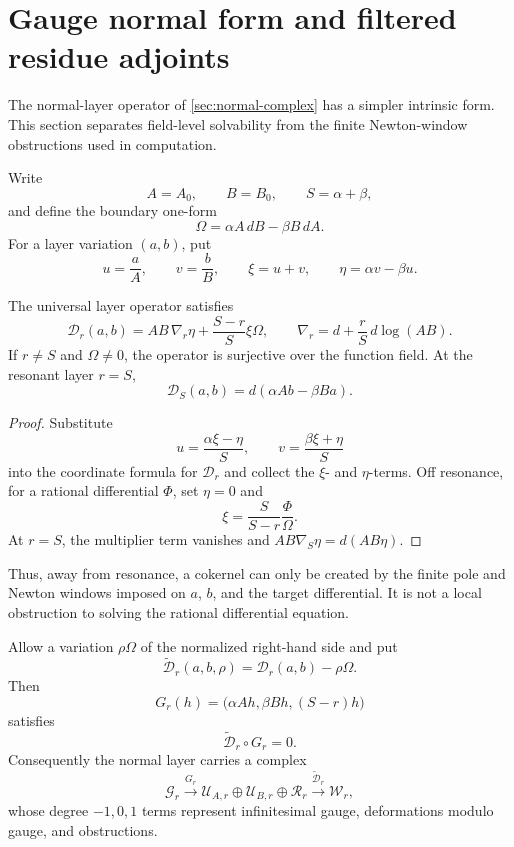 \section{Gauge normal form and filtered residue adjoints}
\label{app:gauge-filtered-residues}

The normal-layer operator of \cref{sec:normal-complex} has a simpler
intrinsic form.  This section separates field-level solvability from the
finite Newton-window obstructions used in computation.

Write
\[
A=A_0,\qquad B=B_0,\qquad S=\alpha+\beta,
\]
and define the boundary one-form
\[
\Omega=\alpha A\,dB-\beta B\,dA.
\]
For a layer variation \((a,b)\), put
\[
u=\frac aA,\qquad v=\frac bB,\qquad
\xi=u+v,\qquad \eta=\alpha v-\beta u.
\]

\begin{proposition}
\label{prop:gauge-normal-form}
The universal layer operator satisfies
\[
\mathscr D_r(a,b)
=AB\,\nabla_r\eta+\frac{S-r}{S}\xi\Omega,
\qquad
\nabla_r=d+\frac rS\,d\log(AB).
\]
If \(r\ne S\) and \(\Omega\ne0\), the operator is surjective over the
function field.  At the resonant layer \(r=S\),
\[
\mathscr D_S(a,b)
=d(\alpha Ab-\beta Ba).
\]
\end{proposition}

\begin{proof}
Substitute
\[
u=\frac{\alpha\xi-\eta}{S},\qquad
v=\frac{\beta\xi+\eta}{S}
\]
into the coordinate formula for \(\mathscr D_r\) and collect the
\(\xi\)- and \(\eta\)-terms.  Off resonance, for a rational differential
\(\Phi\), set \(\eta=0\) and
\[
\xi=\frac{S}{S-r}\frac{\Phi}{\Omega}.
\]
At \(r=S\), the multiplier term vanishes and
\(AB\nabla_S\eta=d(AB\eta)\).
\end{proof}

Thus, away from resonance, a cokernel can only be created by the finite pole
and Newton windows imposed on \(a\), \(b\), and the target differential.  It
is not a local obstruction to solving the rational differential equation.

\begin{proposition}
\label{prop:extended-complex}
Allow a variation \(\rho\Omega\) of the normalized right-hand side and put
\[
\widetilde{\mathscr D}_r(a,b,\rho)
=\mathscr D_r(a,b)-\rho\Omega.
\]
Then
\[
G_r(h)=\bigl(\alpha Ah,\beta Bh,(S-r)h\bigr)
\]
satisfies
\[
\widetilde{\mathscr D}_r\circ G_r=0.
\]
Consequently the normal layer carries a complex
\[
\mathcal G_r\xrightarrow{G_r}
\mathcal U_{A,r}\oplus\mathcal U_{B,r}\oplus\mathcal R_r
\xrightarrow{\widetilde{\mathscr D}_r}\mathcal W_r,
\]
whose degree \(-1,0,1\) terms represent infinitesimal gauge,
deformations modulo gauge, and obstructions.
\end{proposition}

